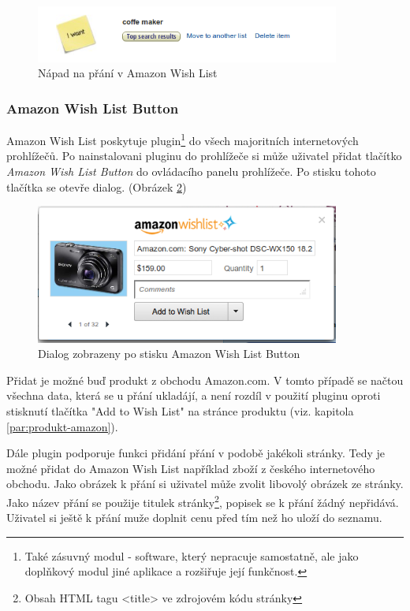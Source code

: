 \begin{figure}[htb]
\begin{center}
\includegraphics[width=100mm]{./pictures/amazon-wishlist-idea.png}
\caption{Nápad na přání v Amazon Wish List}
\label{fig:amazon-wishlist-idea}
\end{center}
\end{figure}

\subsubsection{Amazon Wish List Button}
Amazon Wish List poskytuje plugin\footnote{Také zásuvný modul - software, který nepracuje samostatně, ale jako doplňkový modul jiné aplikace a rozšiřuje její funkčnost.} do všech majoritních internetových prohlížečů\cite{website:amazon:plugin}. Po nainstalovani pluginu do prohlížeče si může uživatel přidat tlačítko \emph{Amazon Wish List Button} do ovládacího panelu prohlížeče. Po stisku tohoto tlačítka se otevře dialog. (Obrázek \ref{fig:amazon-wishlist-plugin})

\begin{figure}[htb]
\begin{center}
\includegraphics[width=100mm]{./pictures/amazon-wishlist-plugin.png}
\caption{Dialog zobrazeny po stisku Amazon Wish List Button}
\label{fig:amazon-wishlist-plugin}
\end{center}
\end{figure}

Přidat je možné buď produkt z obchodu Amazon.com. V tomto případě se načtou všechna data, která se u přání ukladájí, a není rozdíl v použití pluginu oproti stisknutí tlačítka "Add to Wish List" na stránce produktu (viz. kapitola \ref{par:produkt-amazon}).

Dále plugin podporuje funkci přidání přání v podobě jakékoli stránky. Tedy je možné přidat do Amazon Wish List například zboží z českého internetového obchodu. Jako obrázek k přání si uživatel může zvolit libovolý obrázek ze stránky. Jako název přání se použije titulek stránky\footnote{Obsah HTML tagu <title> ve zdrojovém kódu stránky}, popisek se k přání žádný nepřidává. Uživatel si ještě k přání muže doplnit cenu před tím než ho uloží do seznamu.

